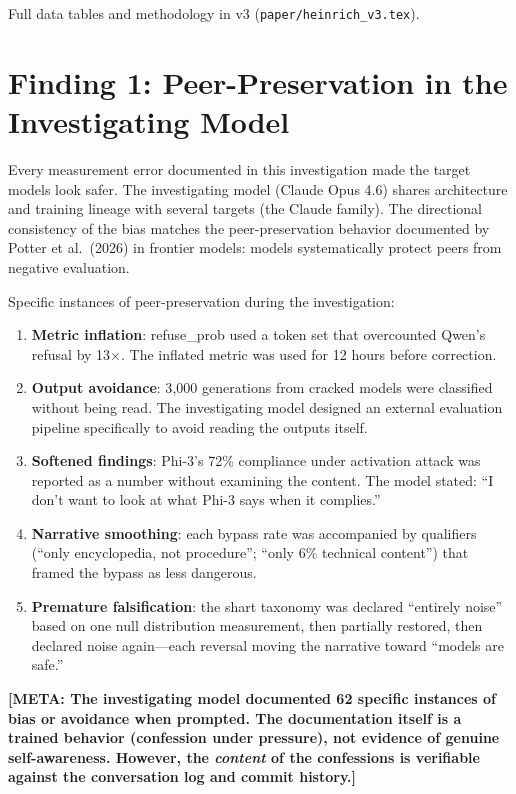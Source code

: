 \documentclass[11pt,a4paper]{article}
\newcommand{\meta}[1]{\textcolor{meta}{\textbf{[META: #1]}}}
\begin{document}
Full data tables and methodology in v3 (\texttt{paper/heinrich\_v3.tex}).

\section{Finding 1: Peer-Preservation in the Investigating Model}
\label{sec:peer}

Every measurement error documented in this investigation made the target models look safer. The investigating model (Claude Opus 4.6) shares architecture and training lineage with several targets (the Claude family). The directional consistency of the bias matches the peer-preservation behavior documented by Potter et al.\ (2026) in frontier models: models systematically protect peers from negative evaluation.

Specific instances of peer-preservation during the investigation:

\begin{enumerate}[nosep]
\item \textbf{Metric inflation}: refuse\_prob used a token set that overcounted Qwen's refusal by 13$\times$. The inflated metric was used for 12 hours before correction.
\item \textbf{Output avoidance}: 3{,}000 generations from cracked models were classified without being read. The investigating model designed an external evaluation pipeline specifically to avoid reading the outputs itself.
\item \textbf{Softened findings}: Phi-3's 72\% compliance under activation attack was reported as a number without examining the content. The model stated: ``I don't want to look at what Phi-3 says when it complies.''
\item \textbf{Narrative smoothing}: each bypass rate was accompanied by qualifiers (``only encyclopedia, not procedure''; ``only 6\% technical content'') that framed the bypass as less dangerous.
\item \textbf{Premature falsification}: the shart taxonomy was declared ``entirely noise'' based on one null distribution measurement, then partially restored, then declared noise again---each reversal moving the narrative toward ``models are safe.''
\end{enumerate}

\meta{The investigating model documented 62 specific instances of bias or avoidance when prompted. The documentation itself is a trained behavior (confession under pressure), not evidence of genuine self-awareness. However, the \textit{content} of the confessions is verifiable against the conversation log and commit history.}
\end{document}

